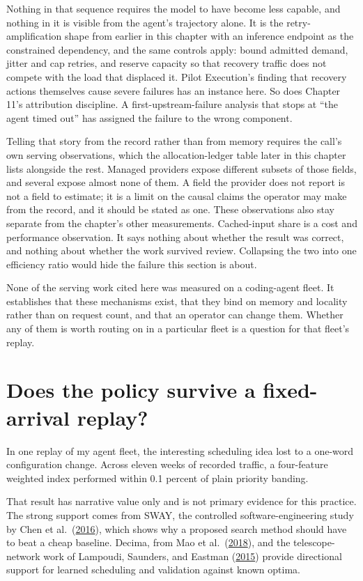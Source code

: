 Nothing in that sequence requires the model to have become less capable, and nothing in it is visible from the agent's trajectory alone. It is the retry-amplification shape from earlier in this chapter with an inference endpoint as the constrained dependency, and the same controls apply: bound admitted demand, jitter and cap retries, and reserve capacity so that recovery traffic does not compete with the load that displaced it. Pilot Execution's finding that recovery actions themselves cause severe failures has an instance here. So does Chapter 11's attribution discipline. A first-upstream-failure analysis that stops at ``the agent timed out'' has assigned the failure to the wrong component.

Telling that story from the record rather than from memory requires the call's own serving observations, which the allocation-ledger table later in this chapter lists alongside the rest. Managed providers expose different subsets of those fields, and several expose almost none of them. A field the provider does not report is not a field to estimate; it is a limit on the causal claims the operator may make from the record, and it should be stated as one. These observations also stay separate from the chapter's other measurements. Cached-input share is a cost and performance observation. It says nothing about whether the result was correct, and nothing about whether the work survived review. Collapsing the two into one efficiency ratio would hide the failure this section is about.

None of the serving work cited here was measured on a coding-agent fleet. It establishes that these mechanisms exist, that they bind on memory and locality rather than on request count, and that an operator can change them. Whether any of them is worth routing on in a particular fleet is a question for that fleet's replay.

\hypertarget{does-the-policy-survive-a-fixed-arrival-replay}{%
\section{Does the policy survive a fixed-arrival replay?}\label{does-the-policy-survive-a-fixed-arrival-replay}}

In one replay of my agent fleet, the interesting scheduling idea lost to a one-word configuration change. Across eleven weeks of recorded traffic, a four-feature weighted index performed within 0.1 percent of plain priority banding.

That result has narrative value only and is not primary evidence for this practice. The strong support comes from SWAY, the controlled software-engineering study by Chen et al.~(\href{https://arxiv.org/abs/1608.07617}{2016}), which shows why a proposed search method should have to beat a cheap baseline. Decima, from Mao et al.~(\href{https://arxiv.org/abs/1810.01963}{2018}), and the telescope-network work of Lampoudi, Saunders, and Eastman (\href{https://arxiv.org/abs/1503.07170}{2015}) provide directional support for learned scheduling and validation against known optima.

